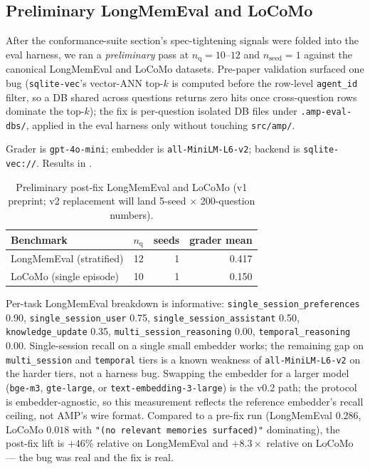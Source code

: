 \documentclass[11pt,letterpaper,twocolumn]{article}
\begin{document}
\subsection{Preliminary LongMemEval and LoCoMo}
\label{sec:eval-mem-benchmarks}

After the conformance-suite section's spec-tightening signals were folded into the eval harness, we ran a \emph{preliminary} pass at $n_{\text{q}} = 10$--$12$ and $n_{\text{seed}} = 1$ against the canonical LongMemEval \cite{wu2024longmemeval} and LoCoMo \cite{maharana2024locomo} datasets. Pre-paper validation surfaced one bug (\texttt{sqlite-vec}'s vector-ANN top-$k$ is computed before the row-level \texttt{agent\_id} filter, so a DB shared across questions returns zero hits once cross-question rows dominate the top-$k$); the fix is per-question isolated DB files under \texttt{.amp-eval-dbs/}, applied in the eval harness only without touching \texttt{src/amp/}.

Grader is \texttt{gpt-4o-mini}; embedder is \texttt{all-MiniLM-L6-v2}; backend is \texttt{sqlite-vec://}. Results in .

\begin{table}[t]
\centering
\caption{Preliminary post-fix LongMemEval and LoCoMo (v1 preprint; v2 replacement will land 5-seed $\times$ 200-question numbers).}
\label{tab:mem-benchmarks}
\begin{tabular}{lrrr}
\toprule
Benchmark & $n_{\text{q}}$ & seeds & grader mean \\
\midrule
LongMemEval (stratified) & 12 & 1 & 0.417 \\
LoCoMo (single episode)  & 10 & 1 & 0.150 \\
\bottomrule
\end{tabular}
\end{table}

Per-task LongMemEval breakdown is informative: \texttt{single\_session\_preferences} 0.90, \texttt{single\_session\_user} 0.75, \texttt{single\_session\_assistant} 0.50, \texttt{knowledge\_update} 0.35, \texttt{multi\_session\_reasoning} 0.00, \texttt{temporal\_reasoning} 0.00. Single-session recall on a single small embedder works; the remaining gap on \texttt{multi\_session} and \texttt{temporal} tiers is a known weakness of \texttt{all-MiniLM-L6-v2} on the harder tiers, not a harness bug. Swapping the embedder for a larger model (\texttt{bge-m3}, \texttt{gte-large}, or \texttt{text-embedding-3-large}) is the v0.2 path; the protocol is embedder-agnostic, so this measurement reflects the reference embedder's recall ceiling, not AMP's wire format. Compared to a pre-fix run (LongMemEval $0.286$, LoCoMo $0.018$ with \texttt{"(no relevant memories surfaced)"} dominating), the post-fix lift is $+46\%$ relative on LongMemEval and $+8.3\times$ relative on LoCoMo --- the bug was real and the fix is real.
\end{document}
